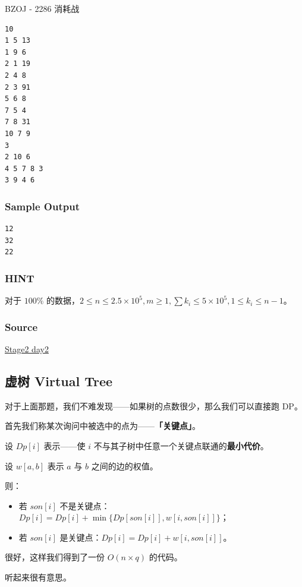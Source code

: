 \begin{NOTE}{BZOJ - 2286 消耗战}{}
\begin{verbatim}
10
1 5 13
1 9 6
2 1 19
2 4 8
2 3 91
5 6 8
7 5 4
7 8 31
10 7 9
3
2 10 6
4 5 7 8 3
3 9 4 6
\end{verbatim}

\subsubsection{Sample Output}

\begin{verbatim}
12
32
22
\end{verbatim}

\subsubsection{HINT}

对于 $100\%$ 的数据，$2\le n\le 2.5\times 10^5,m\ge 1,\sum k_i\le 5\times 10^5,1\le k_i\le n-1$。

\subsubsection{Source}

\href{http://www.lydsy.com/JudgeOnline/problemset.php?search=Stage2\%20day2}{Stage2 day2}

\end{NOTE}


\subsection{虚树 Virtual Tree}

对于上面那题，我们不难发现——如果树的点数很少，那么我们可以直接跑 DP。

首先我们称某次询问中被选中的点为——\textbf{「关键点」}。

设 $Dp[i]$ 表示——使 $i$ 不与其子树中任意一个关键点联通的\textbf{最小代价}。

设 $w[a,b]$ 表示 $a$ 与 $b$ 之间的边的权值。

则：

\begin{itemize}
\item 若 $son[i]$ 不是关键点：$Dp[i]=Dp[i] + \min \{Dp[son[i]],w[i,son[i]]\}$；
\item 若 $son[i]$ 是关键点：$Dp[i]=Dp[i] + w[i,son[i]]$。
\end{itemize}

很好，这样我们得到了一份 $O(n\times q)$ 的代码。

听起来很有意思。

